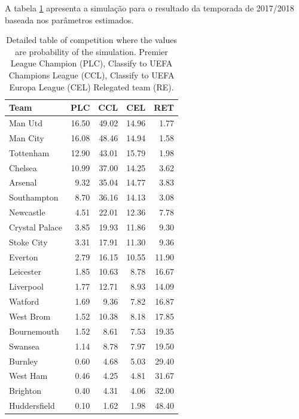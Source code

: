 \documentclass[doc,apacite,oneside,a4paper,12pt]{apa6}
\begin{document}
A tabela \ref{tab:forecastdissi} apresenta a simulação para o resultado da temporada de 2017/2018 baseada nos parâmetros estimados.


\begin{table}[ht]
\centering
\begin{tabular}{lrrrr}
  \hline
Team & PLC & CCL& CEL & RET \\ 
  \hline
Man Utd & 16.50 & 49.02 & 14.96 & 1.77 \\ 
  Man City & 16.08 & 48.46 & 14.94 & 1.58 \\ 
  Tottenham & 12.90 & 43.01 & 15.79 & 1.98 \\ 
  Chelsea & 10.99 & 37.00 & 14.25 & 3.62 \\ 
  Arsenal & 9.32 & 35.04 & 14.77 & 3.83 \\ 
  Southampton & 8.70 & 36.16 & 14.13 & 3.08 \\ 
  Newcastle & 4.51 & 22.01 & 12.36 & 7.78 \\ 
  Crystal Palace & 3.85 & 19.93 & 11.86 & 9.30 \\ 
  Stoke City & 3.31 & 17.91 & 11.30 & 9.36 \\ 
  Everton & 2.79 & 16.15 & 10.55 & 11.90 \\ 
  Leicester & 1.85 & 10.63 & 8.78 & 16.67 \\ 
  Liverpool & 1.77 & 12.71 & 8.93 & 14.09 \\ 
  Watford & 1.69 & 9.36 & 7.82 & 16.87 \\ 
  West Brom & 1.52 & 10.38 & 8.18 & 17.85 \\ 
  Bournemouth & 1.52 & 8.61 & 7.53 & 19.35 \\ 
  Swansea & 1.14 & 8.78 & 7.97 & 19.50 \\ 
  Burnley & 0.60 & 4.68 & 5.03 & 29.40 \\ 
  West Ham & 0.46 & 4.25 & 4.81 & 31.67 \\ 
  Brighton & 0.40 & 4.31 & 4.06 & 32.00 \\ 
  Huddersfield & 0.10 & 1.62 & 1.98 & 48.40 \\ 
   \hline
\end{tabular}
    \caption[\scriptsize{TAVB}]{\scriptsize{Detailed table of competition where the values are probability of the simulation. Premier League Champion (PLC), Classify to UEFA Champions League (CCL), Classify to UEFA Europa League (CEL) Relegated team (RE).}}
    \label{tab:forecastdissi}
\end{table}
\end{document}
